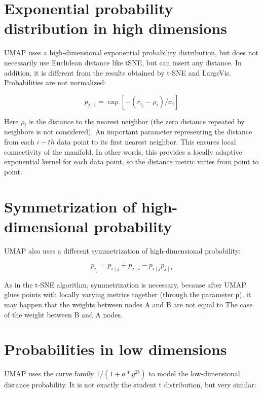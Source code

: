 \section{Exponential probability distribution in high dimensions}

UMAP uses a high-dimensional exponential probability distribution, but does not necessarily use Euclidean distance like tSNE, but can insert any distance. In addition, it is different from the results obtained by t-SNE and LargeVis. Probabilities are not normalized:

\begin{equation*}
    {p_{j\mid i}} = \exp {[−(r_i_j− \rho_i)/\sigma_i]} 
\end{equation*}

\noindent Here $\rho_i$ is the distance to the nearest neighbor (the zero distance repeated by neighbors is not considered). An important parameter representing the distance from each $i-th$ data point to its first nearest neighbor. This ensures local connectivity of the manifold. In other words, this provides a locally adaptive exponential kernel for each data point, so the distance metric varies from point to point. \\

\section{Symmetrization of high-dimensional probability}

UMAP also uses a different symmetrization of high-dimensional probability:

\begin{equation*}
    {p_i_j} = p_{i\mid j} + p_{j\mid i} - p_{i\mid j}p_{j\mid i}
\end{equation*}

\noindent As in the t-SNE algorithm, symmetrization is necessary, because after UMAP glues points with locally varying metrics together (through the parameter ρ), it may happen that the weights between nodes A and B are not equal to The case of the weight between B and A nodes.

\section{Probabilities in low dimensions}

\noindent  UMAP uses the curve family $1/(1+ a * y ^{2b})$ to model the low-dimensional distance probability. It is not exactly the student t distribution, but very similar:

